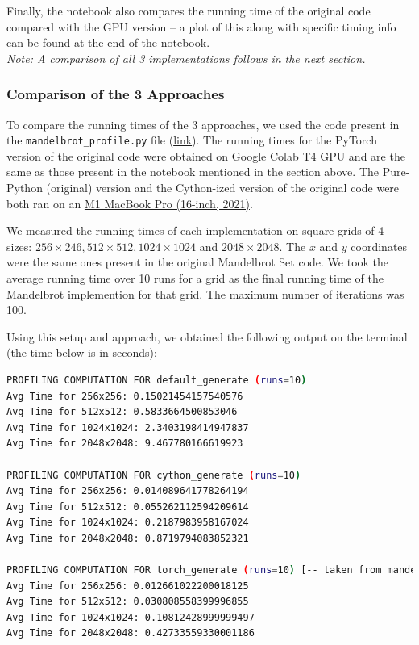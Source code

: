 \documentclass[a4paper,12pt]{article}
\begin{document}
Finally, the notebook also compares the running time of the original code compared with the GPU version -- a plot of this along with specific timing info can be found at the end of the notebook. \\
\textit{Note: A comparison of all 3 implementations follows in the next section.}

\subsubsection{Comparison of the 3 Approaches}
To compare the running times of the 3 approaches, we used the code present in the \verb|mandelbrot_profile.py| file (\href{https://github.com/paulmyr/DD2358-HPC25/blob/master/03_compgpu/bonus/mandelbrot_profile.py}{link}). The running times for the PyTorch version of the original code were obtained on Google Colab T4 GPU and are the same as those present in the notebook mentioned in the section above. The Pure-Python (original) version and the Cython-ized version of the original code were both ran on an \underline{M1 MacBook Pro (16-inch, 2021)}. 

We measured the running times of each implementation on square grids of 4 sizes: $256 \times 246, 512 \times 512, 1024 \times 1024$ and $2048 \times 2048$. The $x$ and $y$ coordinates were the same ones present in the original Mandelbrot Set code. We took the average running time over 10 runs for a grid as the final running time of the Mandelbrot implemention for that grid. The maximum number of iterations was 100. 

Using this setup and approach, we obtained the following output on the terminal (the time below is in seconds): 

\begin{lstlisting}[language=bash,basicstyle=\tiny\ttfamily]
PROFILING COMPUTATION FOR default_generate (runs=10)
Avg Time for 256x256: 0.15021454157540576
Avg Time for 512x512: 0.5833664500853046
Avg Time for 1024x1024: 2.3403198414947837
Avg Time for 2048x2048: 9.467780166619923

PROFILING COMPUTATION FOR cython_generate (runs=10)
Avg Time for 256x256: 0.014089641778264194
Avg Time for 512x512: 0.055262112594209614
Avg Time for 1024x1024: 0.2187983958167024
Avg Time for 2048x2048: 0.8719794083852321

PROFILING COMPUTATION FOR torch_generate (runs=10) [-- taken from mandelbrot_torch.ipynb notebook]
Avg Time for 256x256: 0.012661022200018125
Avg Time for 512x512: 0.030808558399996855
Avg Time for 1024x1024: 0.10812428999999497
Avg Time for 2048x2048: 0.42733559330001186
\end{lstlisting}
\end{document}
